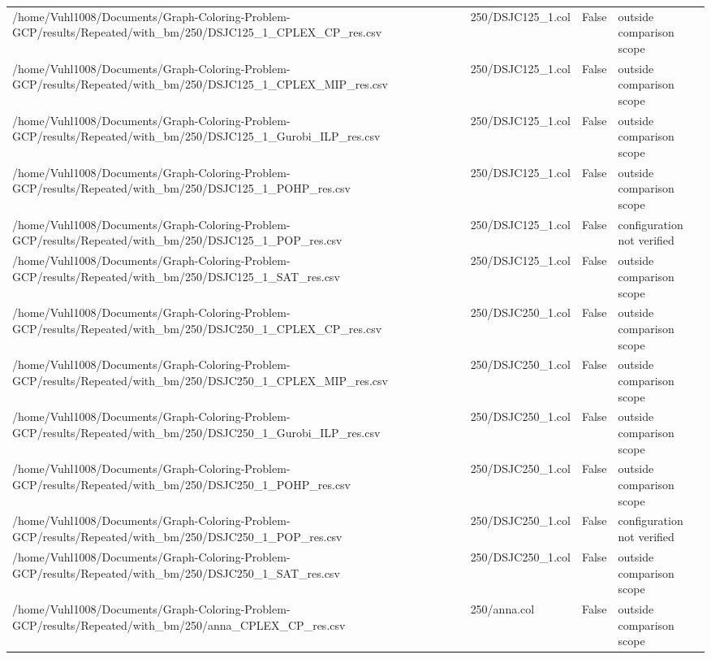 \begin{table}[htbp]
\begin{tabular}{llll}
/home/Vuhl1008/Documents/Graph-Coloring-Problem-GCP/results/Repeated/with\_bm/250/DSJC125\_1\_CPLEX\_CP\_res.csv & 250/DSJC125\_1.col & False & outside comparison scope \\
/home/Vuhl1008/Documents/Graph-Coloring-Problem-GCP/results/Repeated/with\_bm/250/DSJC125\_1\_CPLEX\_MIP\_res.csv & 250/DSJC125\_1.col & False & outside comparison scope \\
/home/Vuhl1008/Documents/Graph-Coloring-Problem-GCP/results/Repeated/with\_bm/250/DSJC125\_1\_Gurobi\_ILP\_res.csv & 250/DSJC125\_1.col & False & outside comparison scope \\
/home/Vuhl1008/Documents/Graph-Coloring-Problem-GCP/results/Repeated/with\_bm/250/DSJC125\_1\_POHP\_res.csv & 250/DSJC125\_1.col & False & outside comparison scope \\
/home/Vuhl1008/Documents/Graph-Coloring-Problem-GCP/results/Repeated/with\_bm/250/DSJC125\_1\_POP\_res.csv & 250/DSJC125\_1.col & False & configuration not verified \\
/home/Vuhl1008/Documents/Graph-Coloring-Problem-GCP/results/Repeated/with\_bm/250/DSJC125\_1\_SAT\_res.csv & 250/DSJC125\_1.col & False & outside comparison scope \\
/home/Vuhl1008/Documents/Graph-Coloring-Problem-GCP/results/Repeated/with\_bm/250/DSJC250\_1\_CPLEX\_CP\_res.csv & 250/DSJC250\_1.col & False & outside comparison scope \\
/home/Vuhl1008/Documents/Graph-Coloring-Problem-GCP/results/Repeated/with\_bm/250/DSJC250\_1\_CPLEX\_MIP\_res.csv & 250/DSJC250\_1.col & False & outside comparison scope \\
/home/Vuhl1008/Documents/Graph-Coloring-Problem-GCP/results/Repeated/with\_bm/250/DSJC250\_1\_Gurobi\_ILP\_res.csv & 250/DSJC250\_1.col & False & outside comparison scope \\
/home/Vuhl1008/Documents/Graph-Coloring-Problem-GCP/results/Repeated/with\_bm/250/DSJC250\_1\_POHP\_res.csv & 250/DSJC250\_1.col & False & outside comparison scope \\
/home/Vuhl1008/Documents/Graph-Coloring-Problem-GCP/results/Repeated/with\_bm/250/DSJC250\_1\_POP\_res.csv & 250/DSJC250\_1.col & False & configuration not verified \\
/home/Vuhl1008/Documents/Graph-Coloring-Problem-GCP/results/Repeated/with\_bm/250/DSJC250\_1\_SAT\_res.csv & 250/DSJC250\_1.col & False & outside comparison scope \\
/home/Vuhl1008/Documents/Graph-Coloring-Problem-GCP/results/Repeated/with\_bm/250/anna\_CPLEX\_CP\_res.csv & 250/anna.col & False & outside comparison scope \\

\end{tabular}
\end{table}

